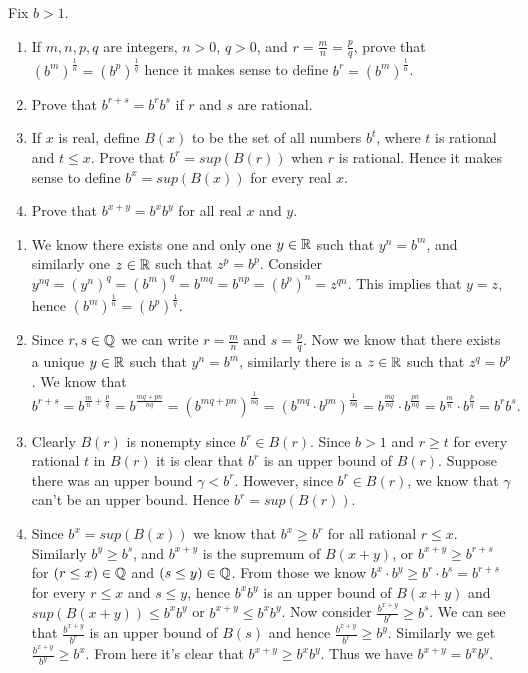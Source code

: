 \begin{problem}
  Fix $b > 1$.
  \begin{enumerate}[label=(\alph*)]
    \item If $m, n, p, q$ are integers, $n > 0$, $q > 0$, and $r = \frac{m}{n} = \frac{p}{q}$, prove that $(b^m)^{\frac{1}{n}} = (b^p)^{\frac{1}{q}}$ hence it makes sense to define $b^r = (b^m)^{\frac{1}{n}}$.
    \item Prove that $b^{r + s} = b^rb^s$ if $r$ and $s$ are rational.
    \item If $x$ is real, define $B(x)$ to be the set of all numbers $b^t$, where $t$ is rational and $t \le x$. Prove that $b^r = sup(B(r))$ when $r$ is rational. Hence it makes sense to define $b^x = sup(B(x))$ for every real $x$.
    \item Prove that $b^{x + y} = b^xb^y$ for all real $x$ and $y$.
  \end{enumerate}
\end{problem}

\begin{solution}
  \begin{enumerate}[label=(\alph*)]
    \item We know there exists one and only one $y \in \mathbb{R}$ such that $y^n = b^m$, and similarly one $z \in \mathbb{R}$ such that $z^p = b^p$.
      Consider $y^{nq} = (y^n)^q = (b^m)^q = b^{mq} = b^{np} = (b^p)^n = z^{qn}$.
      This implies that $y = z$, hence $(b^m)^{\frac{1}{n}} = (b^p)^{\frac{1}{q}}$.
    \item Since $r, s \in \mathbb{Q}$ we can write $r = \frac{m}{n}$ and $s = \frac{p}{q}$.
      Now we know that there exists a unique $y \in \mathbb{R}$ such that $y^n = b^m$, similarly there is a $z \in \mathbb{R}$ such that $z^q = b^p$.
      We know that \[b^{r + s} = b^{\frac{m}{n} + \frac{p}{q}} = b^{\frac{mq + pn}{nq}} = (b^{mq + pn})^{\frac{1}{nq}} = (b^{mq} \cdot b^{pn})^{\frac{1}{nq}} = b^{\frac{mq}{nq}} \cdot b^{\frac{pn}{nq}} = b^{\frac{m}{n}} \cdot b^{\frac{p}{q}} = b^rb^s.\]
    \item Clearly $B(r)$ is nonempty since $b^r \in B(r)$.
      Since $b > 1$ and $r \ge t$ for every rational $t$ in $B(r)$ it is clear that $b^r$ is an upper bound of $B(r)$.
      Suppose there was an upper bound $\gamma < b^r$.
      However, since $b^r \in B(r)$, we know that $\gamma$ can't be an upper bound. Hence $b^r = sup(B(r))$.
    \item Since $b^x = sup(B(x))$ we know that $b^x \ge b^r$ for all rational $r \le x$.
      Similarly $b^y \ge b^s$, and $b^{x + y}$ is the supremum of $B(x + y)$, or $b^{x + y} \ge b^{r + s}$ for $(r \le x) \in \mathbb{Q}$ and $(s \le y) \in \mathbb{Q}$.
      From those we know $b^x \cdot b^y \ge b^r \cdot b^s = b^{r + s}$ for every $r \le x$ and $s \le y$, hence $b^xb^y$ is an upper bound of $B(x + y)$ and $sup(B(x + y)) \le b^xb^y$ or $b^{x + y} \le b^xb^y$.
      Now consider $\frac{b^{x + y}}{b^r} \ge b^s$.
      We can see that $\frac{b^{x + y}}{b^r}$ is an upper bound of $B(s)$ and hence $\frac{b^{x + y}}{b^r} \ge b^y$.
      Similarly we get $\frac{b^{x + y}}{b^y} \ge b^x$.
      From here it's clear that $b^{x + y} \ge b^xb^y$.
      Thus we have $b^{x + y} = b^xb^y$.
  \end{enumerate}
\end{solution}

